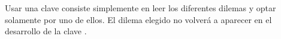 Usar una clave consiste simplemente en leer los diferentes dilemas y optar solamente por uno de ellos. El dilema elegido no volverá a aparecer en el desarrollo de la clave \cite{claveDicotomica}.


































































